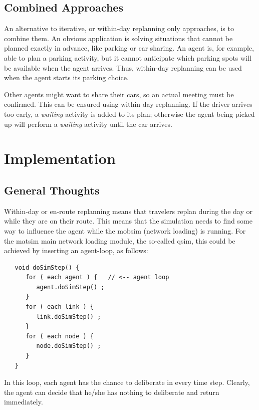 \subsection{Combined Approaches} 
\label{sec:CombinedApproaches}
An alternative to iterative, or within-day replanning only approaches, is to combine them. An obvious application is solving situations that cannot be planned exactly in advance, like parking or car sharing. An agent is, for example, able to plan a parking activity, but it cannot anticipate which parking spots will be available when the agent arrives. Thus, within-day replanning can be used when the agent starts its parking choice.

Other agents might want to share their cars, so an actual meeting must be confirmed. This can be ensured using within-day replanning. If the driver arrives too early, a \emph{waiting} activity is added to its plan; otherwise the agent being picked up will perform a \emph{waiting} activity until the car arrives.

\section{Implementation}
\subsection{General Thoughts}
Within-day or en-route replanning means that travelers replan during the day or while they are on their route. This means that the simulation needs to find some way to influence the agent while the \gls{mobsim} (network loading) is running. For the \gls{matsim} main network loading module, the so-called \gls{qsim}, this could be achieved by inserting an agent-loop, as follows:
\begin{lstlisting}
   void doSimStep() {
      for ( each agent ) {   // <-- agent loop
         agent.doSimStep() ;
      }
      for ( each link ) {
         link.doSimStep() ;
      }
      for ( each node ) {
         node.doSimStep() ;
      }
   }  
\end{lstlisting}
In this loop, each agent has the chance to deliberate in every time step. Clearly, the agent can decide that he/she has nothing to deliberate and return immediately.

